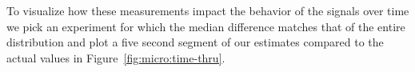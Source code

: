 \begin{Appendix}
To visualize how these measurements impact the behavior of the signals over time we pick an experiment for which the median difference matches that of the entire distribution and plot a five second segment of our estimates compared to the actual values in Figure~\ref{fig:micro:time-thru}.
\end{Appendix}
